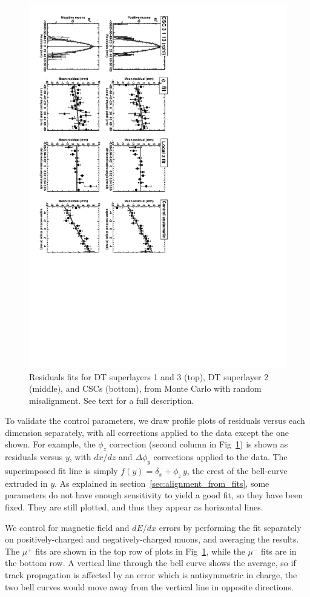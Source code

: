 \documentclass[12pt]{article}
\begin{document}
\begin{figure}
\hspace{0.5 cm} \includegraphics[height=0.8\linewidth, angle=90]{exampleCSC_rphi.pdf}

\caption{Residuals fits for DT superlayers 1 and 3 (top), DT superlayer 2 (middle), and CSCs (bottom), from Monte Carlo with random misalignment.  See text for a full description. \label{fig:residualsfit}}
\end{figure}

To validate the control parameters, we draw profile plots of residuals
versus each dimension separately, with all corrections applied to the
data except the one shown.  For example, the $\phi_z$ correction
(second column in Fig~\ref{fig:residualsfit}) is shown as residuals
versus $y$, with $dx/dz$ and $\Delta \phi_y$ corrections applied to
the data.  The superimposed fit line is simply $f(y) = \delta_x +
\phi_z \, y$, the crest of the bell-curve extruded in $y$.  As
explained in section~\ref{sec:alignment_from_fits}, some parameters do
not have enough sensitivity to yield a good fit, so they have been
fixed.  They are still plotted, and thus they appear as horizontal
lines.

We control for magnetic field and $dE/dx$ errors by performing the fit
separately on positively-charged and negatively-charged muons, and
averaging the results.  The $\mu^+$ fits are shown in the top row of
plots in Fig~\ref{fig:residualsfit}, while the $\mu^-$ fits are in
the bottom row.  A vertical line through the bell curve shows the
average, so if track propagation is affected by an error which is
antisymmetric in charge, the two bell curves would move away from the
vertical line in opposite directions.
\end{document}
